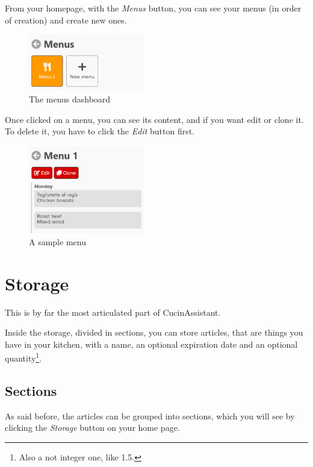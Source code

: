 \documentclass[12pt, a4paper]{report}
\begin{document}
    From your homepage, with the \emph{Menus} button, you can see your menus (in order of creation) and create new ones.

    \begin{figure}[H]
        \centering
        \includegraphics[width=0.45\textwidth]{assets/en/menus.png}
        \caption{The menus dashboard}
    \end{figure}

    Once clicked on a menu, you can see its content, and if you want edit or clone it. To delete it, you have to click the \emph{Edit} button first.

    \begin{figure}[H]
        \centering
        \includegraphics[width=0.45\textwidth]{assets/en/menu.png}
        \caption{A sample menu}
    \end{figure}



    \chapter{Storage}

    This is by far the most articulated part of CucinAssistant.

    Inside the storage, divided in sections, you can store articles, that are things you have in your kitchen, with a name, an optional expiration
    date and an optional quantity\footnote{Also a not integer one, like 1.5.}.

    \section{Sections}

    As said before, the articles can be grouped into sections, which you will see by clicking the \emph{Storage} button on your home page.
\end{document}
